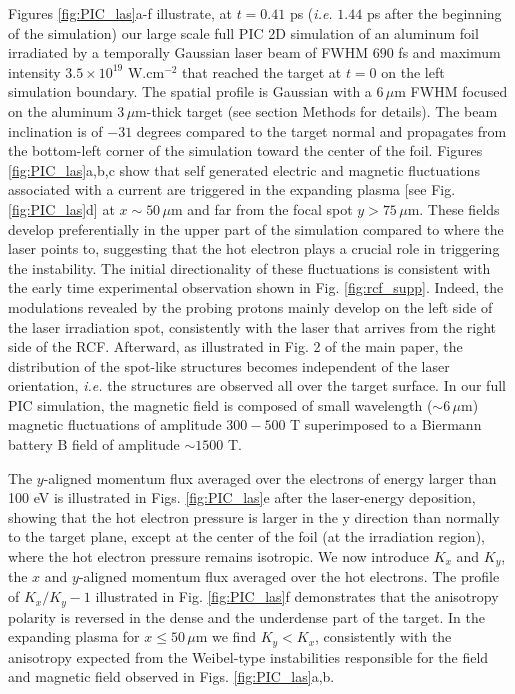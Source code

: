 \documentclass[aps,showpacs,superscriptaddress]{revtex4}
\begin{document}
Figures \ref{fig:PIC_las}a-f illustrate, at $t=0.41$ ps (\emph{i.e.} $1.44$ ps after the beginning of the simulation) our large scale full PIC 2D simulation of an aluminum foil irradiated by a  temporally Gaussian laser beam of  FWHM $690$ fs and maximum intensity $3.5 \times 10^{19}$ W.cm$^{-2}$ that reached the target at $t=0$ on the left simulation boundary. The spatial profile is Gaussian with a $6\, \mu$m FWHM focused on the aluminum $3\,\mu$m-thick target (see section Methods for details). 
The beam inclination is of  $-31$ degrees compared to the target normal and propagates from the bottom-left corner of the simulation toward the center of the foil.
Figures \ref{fig:PIC_las}a,b,c show that self generated electric and magnetic fluctuations associated with a current are triggered in the expanding plasma [see Fig. \ref{fig:PIC_las}d] at $x\sim 50 \, \mu$m and far from the focal spot $y>75\, \mu$m. 
These fields develop preferentially in the upper part of the simulation compared to where the laser points to, suggesting that the  hot electron plays a crucial role in triggering the instability. The initial directionality of these fluctuations is consistent with the early time experimental observation shown in Fig. \ref{fig:rcf_supp}.
Indeed, the modulations revealed by the probing protons mainly develop on the left side of the laser irradiation spot, consistently with  the laser  that arrives   from the right side of the RCF.
Afterward, as illustrated in Fig. 2 of the main paper, the distribution of the spot-like structures   becomes independent of the laser orientation, \emph{i.e.} the structures are observed all over the target surface.
In our full PIC simulation,  the magnetic field is composed of small wavelength ($\sim 6\,\mu$m) magnetic fluctuations of amplitude $300-500$ T superimposed to a Biermann battery B field of amplitude $\sim 1500$ T.

The $y$-aligned momentum flux  averaged over the electrons of energy larger than 100 eV is  illustrated  in Figs.  \ref{fig:PIC_las}e after the laser-energy deposition, showing that the hot electron pressure is larger in the y direction than normally to the target plane, except at the center of the foil (at the irradiation region), where the hot electron pressure remains isotropic. 
We now introduce  $K_x$ and $K_y$, the $x$ and $y$-aligned   momentum flux averaged over the hot electrons.
The profile  of $K_x/K_y-1$ illustrated in Fig. \ref{fig:PIC_las}f demonstrates that  the anisotropy polarity is reversed in the dense and the underdense part of the target. In the expanding plasma for $x \le 50\, \mu$m we find  $K_y < K_x$, consistently with the anisotropy expected from the Weibel-type instabilities responsible for the field and magnetic field observed in Figs.  \ref{fig:PIC_las}a,b.
\end{document}
